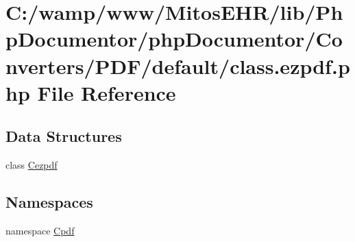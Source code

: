 \hypertarget{class_8ezpdf_8php}{\section{\-C\-:/wamp/www/\-Mitos\-E\-H\-R/lib/\-Php\-Documentor/php\-Documentor/\-Converters/\-P\-D\-F/default/class.ezpdf.\-php \-File \-Reference}
\label{class_8ezpdf_8php}
}
\subsection*{\-Data \-Structures}
\begin{DoxyCompactItemize}
\item 
class \hyperlink{class_cezpdf}{\-Cezpdf}
\end{DoxyCompactItemize}
\subsection*{\-Namespaces}
\begin{DoxyCompactItemize}
\item 
namespace \hyperlink{namespace_cpdf}{\-Cpdf}
\end{DoxyCompactItemize}
